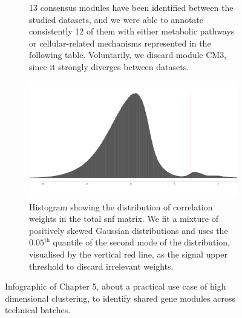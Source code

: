 \documentclass[mainlanguage=english,numlaboratories=2, nofrontcover=true,noaim=false, localbibs, colophon-location=verso-frontcover, oneside, 10pt, localtocs, version=final, nomakeabstract=true]{yathesis}
\begin{document}
{\begin{figure}
\begin{subfigure}[p]{0.4\textwidth}
         \caption{13 consensus modules have been identified between the studied datasets, and we were able to annotate consistently 12 of them with either metabolic pathways or cellular-related mechanisms represented in the following table. Voluntarily, we discard module CM3, since it strongly diverges between datasets.}
         \label{subfig:cheima-modules}
     \end{subfigure}
     \hfill
     \begin{subfigure}[p]{0.4\textwidth}
         \centering
         \includegraphics[width=\textwidth]{figures/distribution_weights_snf.png}
         \caption{Histogram showing the distribution of correlation weights in the total \acrshort{snf} matrix. We fit a mixture of positively skewed Gaussian distributions and uses the $0.05^\text{th}$ quantile of the second mode of the distribution, visualised by  the vertical red line, as the signal upper threshold to discard irrelevant weights.}
         \label{subfig:weight-snf}
     \end{subfigure}    
    \caption{Infographic of Chapter 5, about a practical use case of high dimensional clustering, to identify shared gene modules across technical batches.}
    \label{fig:infographic-louvain-clustering}
\end{figure}

}
\end{document}
